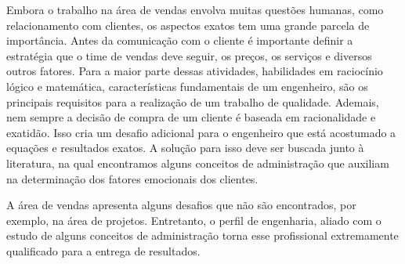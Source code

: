 \documentclass[12pt]{article}
\begin{document}
	Embora o trabalho na área de vendas envolva muitas questões humanas, como relacionamento com clientes, os aspectos exatos tem uma grande parcela de importância. Antes da comunicação com o cliente é importante definir a estratégia que o time de vendas deve seguir, os preços, os serviços e diversos outros fatores. Para a maior parte dessas atividades, habilidades em raciocínio lógico e matemática, características fundamentais de um engenheiro, são os principais requisitos para a realização de um trabalho de qualidade. Ademais, nem sempre a decisão de compra de um cliente é baseada em racionalidade e exatidão. Isso cria um desafio adicional para o engenheiro que está acostumado a equações e resultados exatos. A solução para isso deve ser buscada junto à literatura, na qual encontramos alguns conceitos de administração que auxiliam na determinação dos fatores emocionais dos clientes.
	
	A área de vendas apresenta alguns desafios que não são encontrados, por exemplo, na área de projetos. Entretanto, o perfil de engenharia, aliado com o estudo de alguns conceitos de administração torna esse profissional extremamente qualificado para a entrega de resultados.

\pagebreak
\end{document}
